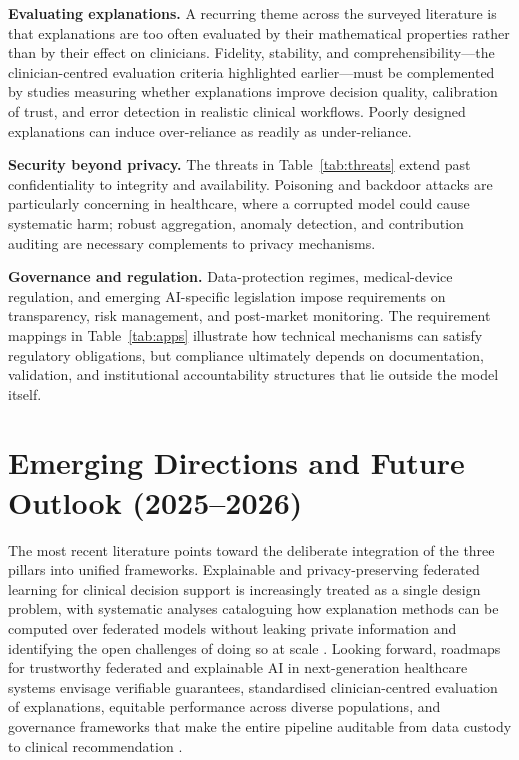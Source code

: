 \documentclass[11pt,a4paper]{article}
\begin{document}
\textbf{Evaluating explanations.} A recurring theme across the surveyed
literature is that explanations are too often evaluated by their mathematical
properties rather than by their effect on clinicians. Fidelity, stability, and
comprehensibility---the clinician-centred evaluation criteria highlighted
earlier---must be complemented by studies measuring whether explanations improve
decision quality,
calibration of trust, and error detection in realistic clinical workflows.
Poorly designed explanations can induce over-reliance as readily as
under-reliance.

\textbf{Security beyond privacy.} The threats in Table~\ref{tab:threats} extend
past confidentiality to integrity and availability. Poisoning and backdoor
attacks are particularly concerning in healthcare, where a corrupted model could
cause systematic harm; robust aggregation, anomaly detection, and contribution
auditing are necessary complements to privacy mechanisms.

\textbf{Governance and regulation.} Data-protection regimes, medical-device
regulation, and emerging AI-specific legislation impose requirements on
transparency, risk management, and post-market monitoring. The requirement
mappings in Table~\ref{tab:apps} illustrate how technical mechanisms can satisfy
regulatory obligations, but compliance ultimately depends on documentation,
validation, and institutional accountability structures that lie outside the
model itself.

\section{Emerging Directions and Future Outlook (2025--2026)}
The most recent literature points toward the deliberate integration of the three
pillars into unified frameworks. Explainable and privacy-preserving federated
learning for clinical decision support is increasingly treated as a single design
problem, with systematic analyses cataloguing how explanation methods can be
computed over federated models without leaking private information and
identifying the open challenges of doing so at scale \cite{ref44}. Looking
forward, roadmaps for trustworthy federated and explainable AI in
next-generation healthcare systems envisage verifiable guarantees, standardised
clinician-centred evaluation of explanations, equitable performance across
diverse populations, and governance frameworks that make the entire pipeline
auditable from data custody to clinical recommendation \cite{ref45}.
\end{document}

